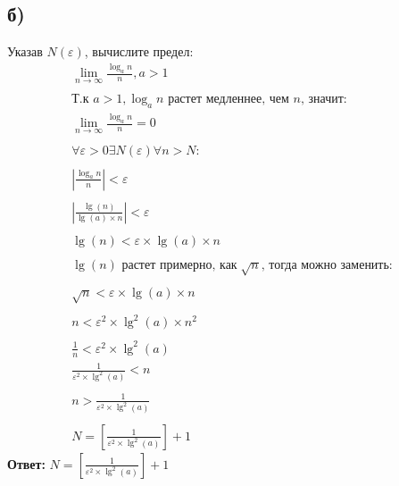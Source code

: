 \documentclass[a4paper,12pt]{article}
\begin{document}
\subsection*{б) }
Указав $ N(\varepsilon) $, вычислите предел:
\begin{equation*}
\begin{gathered}
\lim_{n\to\infty} \frac{\log_an}{n}, a > 1\\\\
\text{Т.к }a > 1 ,\log_an \text{ растет медленнее, чем }n \text{, значит:}\\
\lim_{n\to\infty} \frac{\log_an}{n} = 0\\\\
\forall \varepsilon > 0  \exists N(\varepsilon) \forall n > N:\\\\
|\frac{\log_an}{n}| < \varepsilon\\\\
|\frac{\lg(n)}{\lg(a) \times n}| < \varepsilon\\\\
\lg(n) < \varepsilon \times \lg(a) \times n\\\\
\lg(n) \text{ растет примерно, как}\;\sqrt{n} \text{, тогда можно заменить:}\\\\
\sqrt{n} < \varepsilon \times \lg(a) \times n\\\\
n < \varepsilon^2 \times \lg^2(a) \times n^2\\\\
\frac{1}{n} < \varepsilon^2 \times \lg^2(a)\\
\frac{1}{\varepsilon^2 \times \lg^2 (a)} < n\\\\
n > \frac{1}{\varepsilon^2 \times \lg^2 (a)}\\\\
N = \left[ \frac{1}{\varepsilon^2 \times \lg^2(a)} \right] + 1
\end{gathered}
\end{equation*}
{\Large \textbf{Ответ:}  $ N = \left[ \frac{1}{\varepsilon^2 \times \lg^2(a)} \right] + 1 $}
\end{document}
